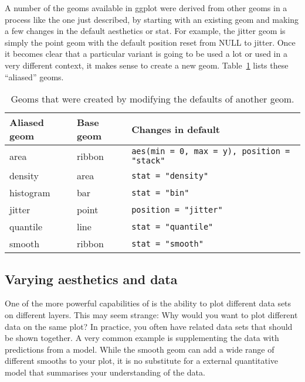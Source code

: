 A number of the geoms available in ggplot were derived from other geoms in a process like the one just described, by starting with an existing geom and making a few changes in the default aesthetics or stat.  For example, the jitter geom is simply the point geom with the default position reset from NULL to jitter.  Once it becomes clear that a particular variant is going to be used a lot or used in a very different context, it makes sense to create a new geom. Table~\ref{tbl:aliased-geoms} lists these ``aliased'' geoms.

\begin{table}
  \begin{center}
  \begin{tabular}{lll}
    \toprule
    Aliased geom & Base geom & Changes in default \\
    \midrule
    area      & ribbon & \verb!aes(min = 0, max = y), position = "stack"!  \\
    density   & area   & \verb!stat = "density"!    \\
    histogram & bar    & \verb!stat = "bin"!        \\
    jitter    & point  & \verb!position = "jitter"! \\
    quantile  & line   & \verb!stat = "quantile"!   \\
    smooth    & ribbon & \verb!stat = "smooth"!     \\
    \bottomrule
  \end{tabular}
  \end{center}
  \caption{Geoms that were created by modifying the defaults of another geom.}
  \label{tbl:aliased-geoms}
\end{table}

\subsection{Varying aesthetics and data}
\label{sub:different_aesthetics}

One of the more powerful capabilities of \ggplot is the ability to plot different data sets on different layers.  This may seem strange: Why would you want to plot different data on the same plot?  In practice, you often have related data sets that should be shown together.  A very common example is supplementing the data with predictions from a model.  While the smooth geom can add a wide range of different smooths to your plot, it is no substitute for a external quantitative model that summarises your understanding of the data.

